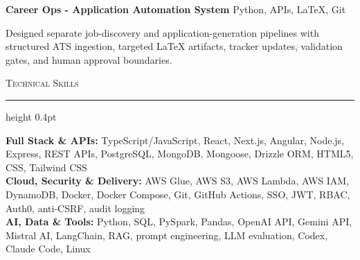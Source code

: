 \documentclass[letterpaper,11pt]{article}
\newcommand{\resumesection}[1]{%
  \par\vspace{2pt}%
  {\large\scshape #1}\par\vspace{2pt}%
  \hrule height 0.4pt\vspace{2pt}%
}
\newcommand{\projectHeading}[2]{
  \textbf{#1} \hfill #2
}
\begin{document}
\projectHeading{Career Ops - Application Automation System}{Python, APIs, LaTeX, Git}
\begin{tightitemize}
  \item Designed separate job-discovery and application-generation pipelines with structured ATS ingestion, targeted LaTeX artifacts, tracker updates, validation gates, and human approval boundaries.
\end{tightitemize}

\resumesection{Technical Skills}
\textbf{Full Stack \& APIs:} TypeScript/JavaScript, React, Next.js, Angular, Node.js, Express, REST APIs, PostgreSQL, MongoDB, Mongoose, Drizzle ORM, HTML5, CSS, Tailwind CSS\\
\textbf{Cloud, Security \& Delivery:} AWS Glue, AWS S3, AWS Lambda, AWS IAM, DynamoDB, Docker, Docker Compose, Git, GitHub Actions, SSO, JWT, RBAC, Auth0, anti-CSRF, audit logging\\
\textbf{AI, Data \& Tools:} Python, SQL, PySpark, Pandas, OpenAI API, Gemini API, Mistral AI, LangChain, RAG, prompt engineering, LLM evaluation, Codex, Claude Code, Linux
\end{document}
